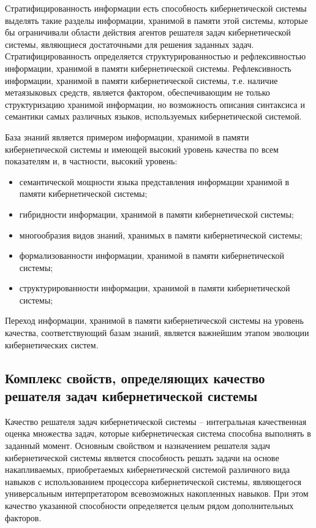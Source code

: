 Стратифицированность информации есть способность кибернетической системы выделять такие разделы информации, хранимой в памяти этой системы, которые бы ограничивали области действия агентов решателя задач кибернетической системы, являющиеся достаточными для решения заданных задач.
Стратифицированность определяется структурированностью и рефлексивностью информации, хранимой в памяти кибернетической системы.
Рефлексивность информации, хранимой в памяти кибернетической системы, т.е. наличие метаязыковых средств, является фактором, обеспечивающим не только структуризацию хранимой информации, но возможность описания синтаксиса и семантики самых различных языков, используемых кибернетической системой.

База знаний является примером информации, хранимой в памяти кибернетической системы и имеющей высокий уровень качества по всем показателям и, в частности, высокий уровень:
\begin{itemize}
    \item{семантической мощности языка представления информации хранимой в памяти кибернетической
системы;}
    \item{гибридности информации, хранимой в памяти кибернетической системы;}
    \item{многообразия видов знаний, хранимых в памяти кибернетической системы;}
    \item{формализованности информации, хранимой в памяти кибернетической системы;}
    \item{структурированности информации, хранимой в памяти кибернетической системы;}
\end{itemize}

Переход информации, хранимой в памяти кибернетической системы на уровень качества, соответствующий базам знаний, является важнейшим этапом эволюции кибернетических систем.


\subsection{Комплекс свойств, определяющих качество решателя задач кибернетической системы}
{\label{sec_cyb_syst_problem_solver_quality}} 

Качество решателя задач кибернетической системы -- интегральная качественная оценка множества задач, которые кибернетическая система способна выполнять в заданный момент.
Основным свойством и назначением решателя задач кибернетической системы является способность решать задачи на основе накапливаемых, приобретаемых кибернетической системой различного вида навыков с использованием процессора кибернетической системы, являющегося универсальным интерпретатором всевозможных накопленных навыков. 
При этом качество указанной способности определяется целым рядом дополнительных факторов.

